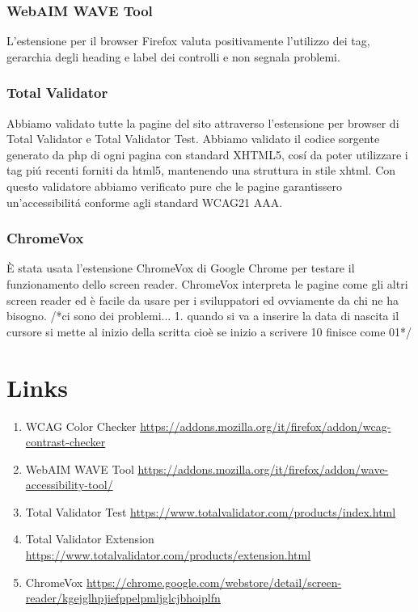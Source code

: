 \subsubsection{WebAIM WAVE Tool}
L'estensione per il browser Firefox valuta positivamente l'utilizzo dei tag, gerarchia degli heading e label dei controlli e non segnala problemi.

\subsubsection{Total Validator}
Abbiamo validato tutte la pagine del sito attraverso l'estensione per browser di Total Validator e Total Validator Test. Abbiamo validato il codice sorgente generato da php di ogni pagina con standard XHTML5, cosí da poter utilizzare i tag piú recenti forniti da html5, mantenendo una struttura in stile xhtml. Con questo validatore abbiamo verificato pure che le pagine garantissero un'accessibilitá conforme agli standard WCAG21 AAA.
\subsubsection{ChromeVox}
È stata usata l'estensione ChromeVox di Google Chrome per testare il funzionamento dello screen reader. ChromeVox interpreta le pagine come gli altri screen reader ed è facile da usare per i sviluppatori ed ovviamente da chi ne ha bisogno. 
/*ci sono dei problemi... 
1. quando si va a inserire la data di nascita il cursore si mette al inizio della scritta cioè se inizio a scrivere 10 finisce come 01*/

\vfill
\section*{Links}
\begin{enumerate}
	\item WCAG Color Checker \url{https://addons.mozilla.org/it/firefox/addon/wcag-contrast-checker} 
    \item WebAIM WAVE Tool \url{https://addons.mozilla.org/it/firefox/addon/wave-accessibility-tool/} 
    \item Total Validator Test \url{https://www.totalvalidator.com/products/index.html}
    \item Total Validator Extension \url{https://www.totalvalidator.com/products/extension.html}
    \item ChromeVox \url{https://chrome.google.com/webstore/detail/screen-reader/kgejglhpjiefppelpmljglcjbhoiplfn}
\end{enumerate}
    